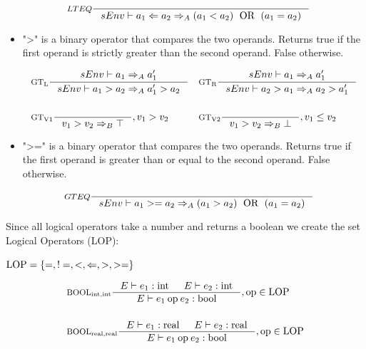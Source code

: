 \begin{itemize}
\begin{align*}
&\inference[$LTEQ$]{}
                    {sEnv \vdash a_1 <= a_2 \Rightarrow_A (a_1 < a_2) \Tor (a_1 = a_2)}
\end{align*}

\item ">" is a binary operator that compares the two operands. Returns true if the first operand is strictly greater than the second operand. False otherwise.

\begin{align*}
&\inference[$\text{GT}_\text{L}$]{sEnv \vdash a_1 \Rightarrow_A a_1'}
                    {sEnv \vdash a_1 > a_2 \Rightarrow_A a_1' > a_2}
&
&\inference[$\text{GT}_\text{R}$]{sEnv \vdash a_1 \Rightarrow_A a_1'}
                    {sEnv \vdash a_2 > a_1 \Rightarrow_A a_2 > a_1'}
\\\\
&\inference[$\text{GT}_\text{V1}$]{}
                    {v_1 > v_2 \Rightarrow_B \top}
                    {, v_1 > v_2}
&
&\inference[$\text{GT}_\text{V2}$]{}
                    {v_1 > v_2 \Rightarrow_B \bot}
                    {, v_1 \leq v_2}
\end{align*}

\item ">=" is a binary operator that compares the two operands. Returns true if the first operand is greater than or equal to the second operand. False otherwise.

\begin{align*}
&\inference[$GTEQ$]{}
                    {sEnv \vdash a_1 >= a_2 \Rightarrow_A (a_1 > a_2) \Tor (a_1 = a_2)}
\end{align*}
\end{itemize}

Since all logical operators take a number and returns a boolean we create the set Logical Operators (LOP):
\begin{center}
$\text{LOP} = \left\{ {=, !=, <, <=, >, >=} \right\}$	
\end{center}

\begin{align*}
&\inference[$\text{BOOL}_{\Tint,\Tint}$]{\Tenv e_1 : \Tint & 
                       \Tenv e_2 : \Tint}
                    {\Tenv e_1 \mathbin{\text{op}} e_2 : \Tbool}, \text{op} \in \Tlop
\\\\
&\inference[$\text{BOOL}_{\Treal,\Treal}$]{\Tenv e_1 : \Treal &
                       \Tenv e_2 : \Treal}
                    {\Tenv e_1 \mathbin{\text{op}} e_2 : \Tbool}, \text{op} \in \Tlop
\end{align*}

